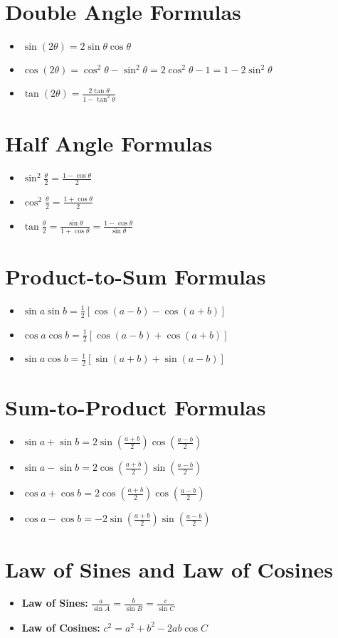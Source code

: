 \documentclass[a4paper,12pt]{article}
\begin{document}
\section*{Double Angle Formulas}
\begin{itemize}
    \item \(\sin(2\theta) = 2\sin \theta \cos \theta\)
    \item \(\cos(2\theta) = \cos^2 \theta - \sin^2 \theta = 2\cos^2 \theta - 1 = 1 - 2\sin^2 \theta\)
    \item \(\tan(2\theta) = \frac{2\tan \theta}{1 - \tan^2 \theta}\)
\end{itemize}

\section*{Half Angle Formulas}
\begin{itemize}
    \item \(\sin^2 \frac{\theta}{2} = \frac{1 - \cos \theta}{2}\)
    \item \(\cos^2 \frac{\theta}{2} = \frac{1 + \cos \theta}{2}\)
    \item \(\tan \frac{\theta}{2} = \frac{\sin \theta}{1 + \cos \theta} = \frac{1 - \cos \theta}{\sin \theta}\)
\end{itemize}

\section*{Product-to-Sum Formulas}
\begin{itemize}
    \item \(\sin a \sin b = \frac{1}{2}[\cos(a-b) - \cos(a+b)]\)
    \item \(\cos a \cos b = \frac{1}{2}[\cos(a-b) + \cos(a+b)]\)
    \item \(\sin a \cos b = \frac{1}{2}[\sin(a+b) + \sin(a-b)]\)
\end{itemize}

\section*{Sum-to-Product Formulas}
\begin{itemize}
    \item \(\sin a + \sin b = 2\sin\left(\frac{a+b}{2}\right)\cos\left(\frac{a-b}{2}\right)\)
    \item \(\sin a - \sin b = 2\cos\left(\frac{a+b}{2}\right)\sin\left(\frac{a-b}{2}\right)\)
    \item \(\cos a + \cos b = 2\cos\left(\frac{a+b}{2}\right)\cos\left(\frac{a-b}{2}\right)\)
    \item \(\cos a - \cos b = -2\sin\left(\frac{a+b}{2}\right)\sin\left(\frac{a-b}{2}\right)\)
\end{itemize}

\section*{Law of Sines and Law of Cosines}
\begin{itemize}
    \item \textbf{Law of Sines:} \(\frac{a}{\sin A} = \frac{b}{\sin B} = \frac{c}{\sin C}\)
    \item \textbf{Law of Cosines:} \(c^2 = a^2 + b^2 - 2ab\cos C\)
\end{itemize}
\end{document}

